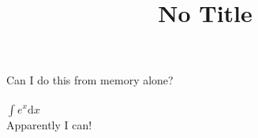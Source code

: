 \documentclass{article}
\title{No Title}
\begin{document}
Can I do this from memory alone?
\\
\\
\(\int e^x \mathrm{d}x\)
\\

Apparently I can!
\end{document}
